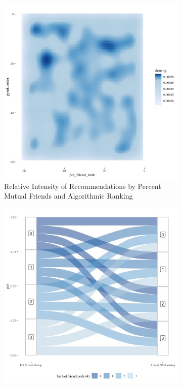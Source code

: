 \documentclass[12pt,letterpaper]{article}
\begin{document}
\begin{figure}[ht]
\caption{Relationship between PYMK Algorithmic Ranking and Chronology and User Stated Preferences}
\label{fig:pymk}
    \begin{subfigure}{.5\textwidth} 
        \centering
        \includegraphics[width=1\linewidth]{Output/Graphs/Audit/Heatmaps/US PYMK pct friends by pymk rank - smooth.jpg}   
        \caption{Relative Intensity of Recommendations by Percent Mutual Friends and Algorithmic Ranking}
        \label{fig:pymkfriend_hm}
        \end{subfigure}
    \begin{subfigure}{.5\textwidth}
        \centering
        \includegraphics[width=1\linewidth]{Output/Graphs/Audit/Sankey flows/US PYMK pct friend to actual.jpg}  

\end{subfigure}
\end{figure}
\end{document}

